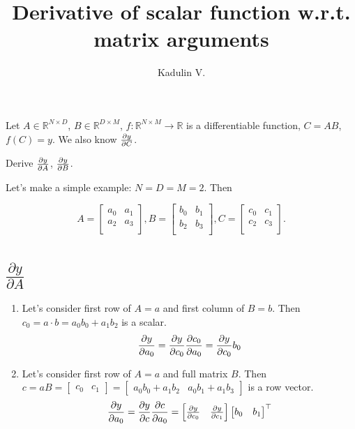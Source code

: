 \documentclass[12pt]{article}
\begin{document}
\title{Derivative of scalar function w.r.t. matrix arguments}
\author{Kadulin V.}
\maketitle

Let $A \in \mathbb{R}^{N \times D}$, $B \in \mathbb{R}^{D \times M}$, 
$f: \mathbb{R}^{N \times M} \rightarrow \mathbb{R}$ is a differentiable function, $C = AB$, $f(C) = y$. We also know $\pdv{y}{C}$. 

Derive $\pdv{y}{A}$, $\pdv{y}{B}$.

Let's make a simple example: $N = D = M = 2$. Then

\[
	A = 
	\begin{bmatrix} 
		a_0 & a_1 \\
		a_2 & a_3 \\
	\end{bmatrix},
	B = 
	\begin{bmatrix} 
		b_0 & b_1 \\
		b_2 & b_3 \\
	\end{bmatrix},
	C = 
	\begin{bmatrix} 
		c_0 & c_1 \\
		c_2 & c_3 \\
	\end{bmatrix}.
\]

\section{$\frac{\partial y}{\partial A}$}

\begin{enumerate}
\item Let's consider first row of $A = a$ and first column of $B = b$.  
Then $c_0 = a \cdot b = a_0b_0 + a_1b_2$ is a scalar.  
\[
	\pdv{y}{a_0} = 
	\pdv{y}{c_0} \pdv{c_0}{a_0} = 
	\pdv{y}{c_0} b_0
\]
\item Let's consider first row of $A = a$ and full matrix $B$.  
Then $
c = aB = 
\begin{bmatrix}c_0 & c_1\end{bmatrix} =
\begin{bmatrix}a_0b_0 + a_1b_2 & a_0b_1 + a_1b_3\end{bmatrix} 
$ is a row vector.  
\[
	\pdv{y}{a_0} = 
	\pdv{y}{c} \pdv{c}{a_0} = 
	\begin{bmatrix}
		\pdv{y}{c_0} & \pdv{y}{c_1}
	\end{bmatrix} 
	\begin{bmatrix} 
		b_0 & b_1
	\end{bmatrix} ^\top
\]
\end{enumerate}
\end{document}
